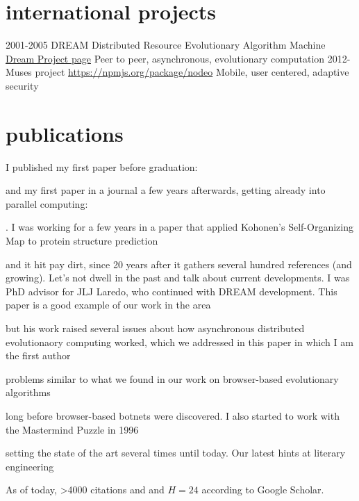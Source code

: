 \documentclass[]{friggeri-jj-cv}
\begin{document}
\section{international projects}

\begin{entrylist}
  \entry
    {2001-2005}
    {{\sf DREAM} Distributed Resource Evolutionary Algorithm Machine}
    {\href{http://www.soc.napier.ac.uk/~benp/dream/dream.htm}{Dream
        Project page}}
    {Peer to peer, asynchronous, evolutionary computation}
  \entry
    {2012-}
    {Muses project}
    {\href{https://musesproject.eu/}{https://npmjs.org/package/nodeo}}
    {Mobile, user centered, adaptive security}
\end{entrylist}

\section{publications}

I published my first paper before graduation: 

\cite{merelo88} 
and my first paper in a journal a few years
afterwards, getting already into parallel computing:

\cite{parallel90}. 
I was working for a few years in a paper that
applied Kohonen's Self-Organizing Map to protein structure prediction

\cite{jjproteng} 
and it hit pay dirt, since 20 years after it gathers
several hundred references (and growing). Let's not dwell in the past
and talk about current developments. I was PhD advisor for JLJ Laredo,
who continued with DREAM development. This paper is a good example of
our work in the area

\cite{evag:gpem}
but his work raised several issues about how asynchronous distributed
evolutionaory computing worked, which we addressed in this paper in
which I am the first author

\cite{jj:2008:PPSN}
problems similar to what we found in our work on browser-based
evolutionary algorithms 

\cite{agajaj}
long before browser-based botnets were discovered. I also started to
work with the Mastermind Puzzle in 1996 

\cite{jj-ppsn96}
setting the state of the art several times until today. Our latest hints at 
literary engineering 

\cite{2014arXiv1403.3084G}
As of today, >4000
citations and and $H=24$ according to Google Scholar.

\end{document}
